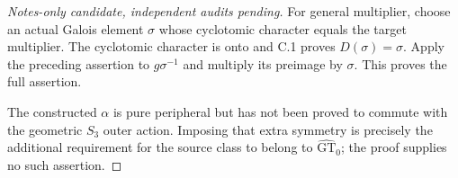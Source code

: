 \begin{proof}[Notes-only candidate, independent audits pending]
For general multiplier, choose an actual Galois element $\sigma$
whose cyclotomic character equals the target multiplier. The
cyclotomic character is onto and C.1 proves $D(\sigma)=\sigma$.
Apply the preceding assertion to $g\sigma^{-1}$ and multiply its
preimage by $\sigma$. This proves the full assertion.

The constructed $\alpha$ is pure peripheral but has not been
proved to commute with the geometric $S_3$ outer action. Imposing
that extra symmetry is precisely the additional requirement for
the source class to belong to $\widehat{\mathrm{GT}}_0$; the
proof supplies no such assertion.
\end{proof}
